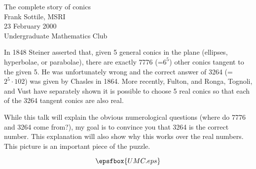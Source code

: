 %
%
%
%



\begin{center}
\Large
The complete story of conics\\
\large
Frank Sottile, MSRI\\
23 February 2000\\
Undergraduate Mathematics Club
\end{center}

  In 1848 Steiner asserted that, given 5 general conics in the plane
(ellipses, hyperbolae, or parabolae), there are exactly 7776 (=$6^5$) other
conics tangent to the given 5.  He was unfortunately wrong and the correct
answer of 3264 (=$2^5 \cdot 102$) was given by Chasles in 1864.  
More recently,
Fulton, and Ronga, Tognoli, and Vust have separately shown it is possible to
choose 5 real conics so that each of the 3264 tangent conics are also real.

  While this talk will explain the obvious numerological questions (where
do 7776 and 3264 come from?), my goal is to convince you that 3264 is the
correct number. This explanation will also show why this works over the real
numbers.
This picture is an important piece of the puzzle.


$$\epsfbox{UMC.eps}$$

